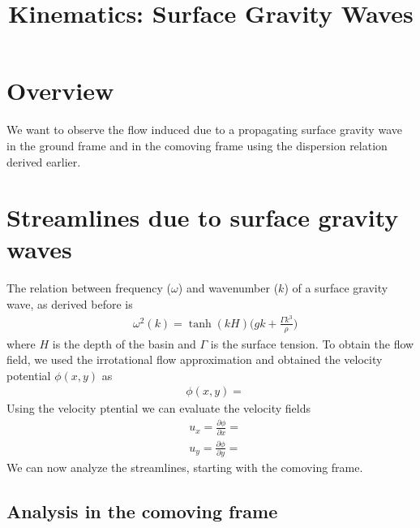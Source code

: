 \documentclass[11pt,a4paper]{article}
\title{Kinematics: Surface Gravity Waves}
\date{\displaydate{date}}
\author{}
\newcommand{\pd}[2]{\frac{\partial #1}{\partial #2}}
\newcommand{\1}{\vect{1}}
\newcommand{\ux}{u_x}
\newcommand{\uy}{u_y}
\begin{document}
\maketitle

\section{Overview}

We want to observe the flow induced due to a propagating surface gravity wave in the ground frame and in the comoving frame using the dispersion relation derived earlier.

\section{Streamlines due to surface gravity waves}

The relation between frequency ($\omega$) and wavenumber ($k$) of a surface gravity wave, as derived before is
\begin{align*}
&\omega^2(k) = \tanh(kH)\bigg(gk + \frac{\Gamma k^3}{\rho} \bigg) \tag{dispersion relation}
\end{align*}
where  $H$ is the depth of the basin and $\Gamma$ is the surface tension. To obtain the flow field, we used the irrotational flow approximation and obtained the velocity potential $\phi(x,y)$ as 
\begin{align*}
&\phi(x,y) =
\end{align*}
Using the velocity ptential we can evaluate the velocity fields
\begin{align*}
&\ux = \pd \phi x = \\
&\uy = \pd \phi y = 
\end{align*}
We can now analyze the streamlines, starting with the comoving frame.

\subsection{Analysis in the comoving frame}
\end{document}
